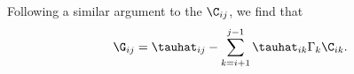 Following a similar argument to the $\C_{i j}$, we find that 
\begin{equation}
\G_{i j} = \tauhat_{i j} - \sum\limits_{k = i + 1}^{j -1} \tauhat_{i k} \Gamma_k \C_{i k}.
\end{equation}
  